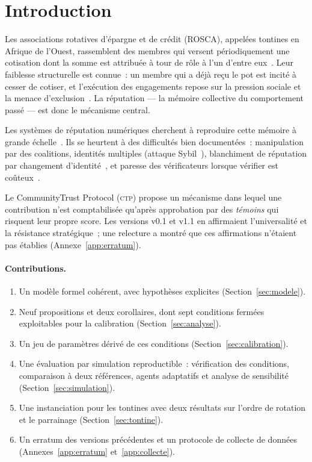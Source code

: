 \documentclass[11pt,a4paper]{article}
\theoremstyle{plain}
\theoremstyle{definition}
\theoremstyle{remark}
\newcommand{\CTP}{\textsc{ctp}}
\newcommand{\1}{\mathbf{1}}
\begin{document}
\section{Introduction}

Les associations rotatives d'épargne et de crédit (ROSCA), appelées tontines en
Afrique de l'Ouest, rassemblent des membres qui versent périodiquement une
cotisation dont la somme est attribuée à tour de rôle à l'un d'entre
eux~\cite{ardener1964,besley1993,handa1999}. Leur faiblesse structurelle est
connue~: un membre qui a déjà reçu le pot est incité à cesser de cotiser, et
l'exécution des engagements repose sur la pression sociale et la menace
d'exclusion~\cite{anderson2009}. La réputation --- la mémoire collective du
comportement passé --- est donc le mécanisme central.

Les systèmes de réputation numériques cherchent à reproduire cette mémoire à
grande échelle~\cite{resnick2000,dellarocas2003,josang2007}. Ils se heurtent à
des difficultés bien documentées~: manipulation par des coalitions, identités
multiples (attaque Sybil~\cite{douceur2002}), blanchiment de réputation par
changement d'identité~\cite{friedman2001}, et paresse des
vérificateurs lorsque vérifier est coûteux~\cite{luu2015}.

Le CommunityTrust Protocol (\CTP{}) propose un mécanisme dans lequel une
contribution n'est comptabilisée qu'après approbation par des \emph{témoins}
qui risquent leur propre score. Les versions v0.1 et v1.1 en affirmaient
l'universalité et la résistance stratégique~; une relecture a montré que ces
affirmations n'étaient pas établies (Annexe~\ref{app:erratum}).

\paragraph{Contributions.}
\begin{enumerate}
  \item Un modèle formel cohérent, avec hypothèses explicites
    (Section~\ref{sec:modele}).
  \item Neuf propositions et deux corollaires, dont sept conditions fermées
    exploitables pour la calibration (Section~\ref{sec:analyse}).
  \item Un jeu de paramètres dérivé de ces conditions
    (Section~\ref{sec:calibration}).
  \item Une évaluation par simulation reproductible~: vérification des
    conditions, comparaison à deux références, agents adaptatifs et analyse de
    sensibilité (Section~\ref{sec:simulation}).
  \item Une instanciation pour les tontines avec deux résultats sur l'ordre de
    rotation et le parrainage (Section~\ref{sec:tontine}).
  \item Un erratum des versions précédentes et un protocole de collecte de
    données (Annexes~\ref{app:erratum} et~\ref{app:collecte}).
\end{enumerate}
\end{document}
